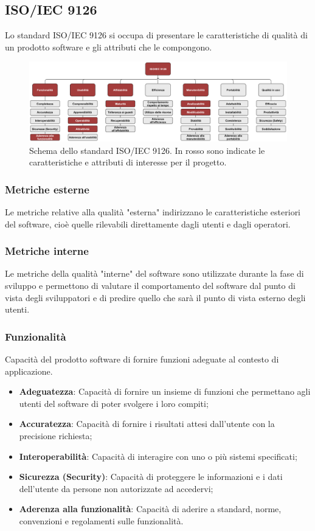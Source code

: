 \subsection{ISO/IEC 9126}
Lo standard ISO/IEC 9126 si occupa di presentare le caratteristiche di qualità di un prodotto software e gli attributi che le compongono.

\begin{figure}[h]
    \centering
    \includegraphics[scale=0.53]{Immagini/IsoIec9126.png}
    \caption{Schema dello standard ISO/IEC 9126. In rosso sono indicate le caratteristiche e attributi di interesse per il progetto.}
\end{figure}

\subsubsection{Metriche esterne}
Le metriche relative alla qualità "esterna" indirizzano le caratteristiche esteriori del software, cioè quelle rilevabili direttamente dagli utenti e dagli operatori.

\subsubsection{Metriche interne}
 Le metriche della qualità "interne" del software sono utilizzate durante la fase di sviluppo e permettono di valutare il comportamento del software dal punto di vista degli sviluppatori e di predire quello che sarà il punto di vista esterno degli utenti.

\subsubsection{Funzionalità}
Capacità del prodotto software di fornire funzioni adeguate al contesto di applicazione.
\begin{itemize}
\item \textbf{Adeguatezza}: Capacità di fornire un insieme di funzioni che permettano agli utenti del software di poter svolgere i loro compiti;
\item \textbf{Accuratezza}: Capacità di fornire i risultati attesi dall’utente con la precisione richiesta;
\item \textbf{Interoperabilità}: Capacità di interagire con uno o più sistemi specificati;
\item \textbf{Sicurezza (Security)}: Capacità di proteggere le informazioni e i dati dell’utente da persone non autorizzate ad accedervi;
\item \textbf{Aderenza alla funzionalità}: Capacità di aderire a standard, norme, convenzioni e regolamenti sulle funzionalità.
\end{itemize}


